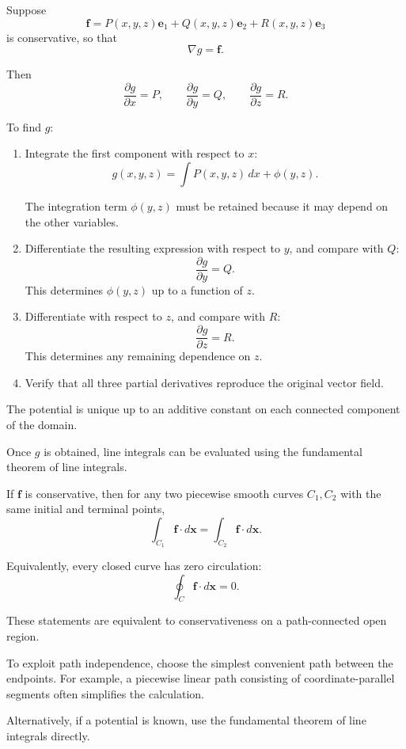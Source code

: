 \begin{method}
Suppose
\[
\boldsymbol f
=
P(x,y,z)\boldsymbol e_1
+
Q(x,y,z)\boldsymbol e_2
+
R(x,y,z)\boldsymbol e_3
\]
is conservative, so that
\[
\nabla g=\boldsymbol f.
\]

Then
\[
\frac{\partial g}{\partial x}=P,\qquad
\frac{\partial g}{\partial y}=Q,\qquad
\frac{\partial g}{\partial z}=R.
\]

To find \(g\):

\begin{enumerate}
    \item Integrate the first component with respect to \(x\):
    \[
    g(x,y,z)=\int P(x,y,z)\,dx+\phi(y,z).
    \]

    The integration term \(\phi(y,z)\) must be retained because it may depend on the other variables.

    \item Differentiate the resulting expression with respect to \(y\), and compare with \(Q\):
    \[
    \frac{\partial g}{\partial y}=Q.
    \]
    This determines \(\phi(y,z)\) up to a function of \(z\).

    \item Differentiate with respect to \(z\), and compare with \(R\):
    \[
    \frac{\partial g}{\partial z}=R.
    \]
    This determines any remaining dependence on \(z\).

    \item Verify that all three partial derivatives reproduce the original vector field.
\end{enumerate}

The potential is unique up to an additive constant on each connected component of the domain.

Once \(g\) is obtained, line integrals can be evaluated using the fundamental theorem of line integrals.
\end{method}

\begin{method}
If \(\boldsymbol f\) is conservative, then for any two piecewise smooth curves \(C_1,C_2\) with the same initial and terminal points,
\[
\boxed{
\int_{C_1}\boldsymbol f\cdot d\boldsymbol x
=
\int_{C_2}\boldsymbol f\cdot d\boldsymbol x.
}
\]

Equivalently, every closed curve has zero circulation:
\[
\boxed{
\oint_C\boldsymbol f\cdot d\boldsymbol x=0.
}
\]

These statements are equivalent to conservativeness on a path-connected open region.

To exploit path independence, choose the simplest convenient path between the endpoints. For example, a piecewise linear path consisting of coordinate-parallel segments often simplifies the calculation.

Alternatively, if a potential is known, use the fundamental theorem of line integrals directly.
\end{method}

